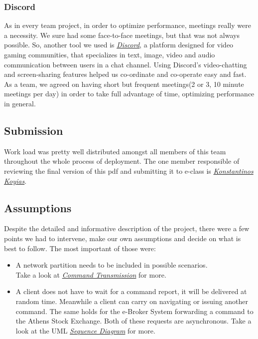 \documentclass{article}
\begin{document}
\subsubsection{Discord}
As in every team project, in order to optimize performance, meetings really were a necessity. We sure had some face-to-face meetings, but that was not always possible. So, another tool we used is \href{https://discordapp.com/}{\underline{\emph{Discord}}}, a platform designed for video gaming communities, that specializes in text, image, video and audio communication between users in a chat channel. Using Discord's video-chatting and screen-sharing features helped us co-ordinate and co-operate easy and fast. As a team, we agreed on having short but frequent meetings(2 or 3, 10 minute meetings per day) in order to take full advantage of time, optimizing performance in general.

\subsection{Submission}
Work load was pretty well distributed amongst all members of this team throughout the whole process of deployment. The one member responsible of reviewing the final version of this pdf and submitting it to e-class is{\hypersetup{
    urlcolor=black,    
}
\href{https://github.com/KostasKoyias}{\emph{Konstantinos Koyias}}}.  

\newpage
\subsection{Assumptions}
Despite the detailed and informative description of the project, there were a few points we had to intervene, make our own assumptions and decide on what is best to follow. The most important of those were:
\begin{itemize}
\item A network partition needs to be included in possible scenarios.\\
Take a look at {\hypersetup{
    linkcolor=blue,    
}\hyperlink{CmdTrns}{\textit{Command Transmission}}} for more. 
\item A client does not have to wait for a command report, it will be delivered at random time. Meanwhile a client can
carry on navigating or issuing another command. The same holds for the e-Broker System forwarding a command to the
Athens Stock Exchange. Both of these requests are asynchronous. Take a look at the UML {\hypersetup{
    linkcolor=blue,    
}\hyperlink{Asynchronous}{\textit{Sequence Diagram}}} for more.
\end{itemize} 
\end{document}
